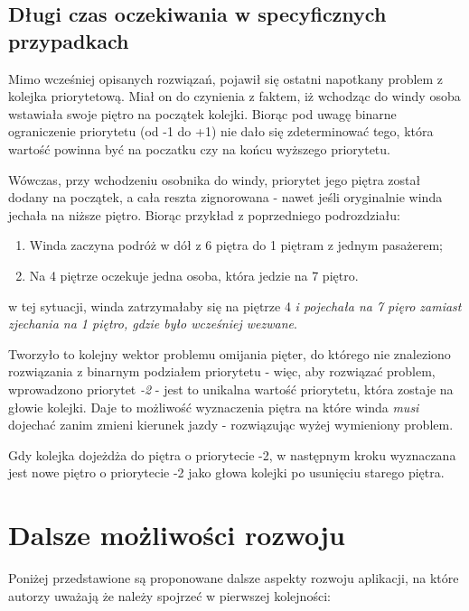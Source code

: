 \documentclass[12pt, a4paper]{article}
\begin{document}
\subsection{Długi czas oczekiwania w specyficznych przypadkach}

Mimo wcześniej opisanych rozwiązań, pojawił się ostatni napotkany problem z kolejka priorytetową. Miał on do czynienia z faktem, iż wchodząc do windy osoba wstawiała 
swoje piętro na początek kolejki. Biorąc pod uwagę binarne ograniczenie priorytetu (od -1 do +1) nie dało się zdeterminować tego, która wartość powinna być na poczatku czy na 
końcu wyższego priorytetu.

Wówczas, przy wchodzeniu osobnika do windy, priorytet jego piętra został dodany na początek, a cała reszta zignorowana - nawet jeśli oryginalnie winda jechała na niższe piętro.
Biorąc przykład z poprzedniego podrozdziału:

\begin{enumerate}
  \item Winda zaczyna podróż w dół z 6 piętra do 1 piętram z jednym pasażerem;
  \item Na 4 piętrze oczekuje jedna osoba, która jedzie na 7 piętro.
\end{enumerate} 

w tej sytuacji, winda zatrzymałaby się na piętrze 4 \emph{i pojechała na 7 pięro zamiast zjechania na 1 piętro, gdzie było wcześniej wezwane}.

Tworzyło to kolejny wektor problemu omijania pięter, do którego nie znaleziono rozwiązania z binarnym podziałem priorytetu - więc, aby rozwiązać problem, wprowadzono priorytet
\emph{-2} - jest to unikalna wartość priorytetu, która zostaje na głowie kolejki. Daje to możliwość wyznaczenia piętra na które winda \emph{musi} dojechać zanim zmieni
kierunek jazdy - rozwiązując wyżej wymieniony problem.

Gdy kolejka dojeżdża do piętra o priorytecie -2, w następnym kroku wyznaczana jest nowe piętro o priorytecie -2 jako głowa kolejki po usunięciu starego piętra.

\section{Dalsze możliwości rozwoju}

Poniżej przedstawione są proponowane dalsze aspekty rozwoju aplikacji, na które autorzy uważają że należy spojrzeć w pierwszej kolejności:
\end{document}
